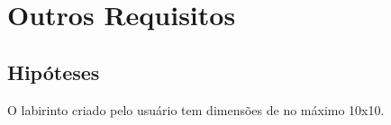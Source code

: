 \chapter{Outros Requisitos}

\section{Hipóteses}
O labirinto criado pelo usuário tem dimensões de no máximo 10x10.





